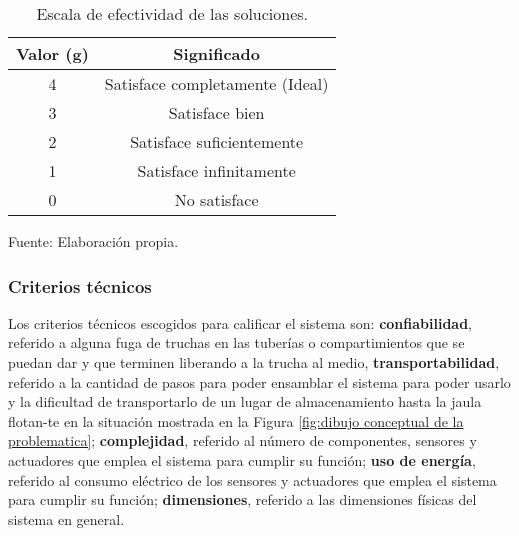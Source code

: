 \begin{table}[H]
	\centering
	\caption{Escala de efectividad de las soluciones.}
	\label{tab:escala de efectividad de las soluciones}
	\begin{tabular}{|c|c|}
		\hline
		\rowcolor[HTML]{D9D9D9} 
		\textbf{Valor (g)} & \textbf{Significado} 					\\ \hline
		4                  & Satisface completamente (Ideal)        \\ \hline
		3                  & Satisface bien           				\\ \hline
		2                  & Satisface suficientemente        		\\ \hline
		1                  & Satisface infinitamente     			\\ \hline
		0                  & No satisface				     		\\ \hline
	\end{tabular}
	\begin{myflushleftportland}
		Fuente: Elaboración propia.
	\end{myflushleftportland}
\end{table}


\subsubsection{Criterios técnicos}

Los criterios técnicos escogidos para calificar el sistema son: \textbf{confiabilidad}, referido a alguna fuga de truchas en las tuberías o compartimientos que se puedan dar y que terminen liberando a la trucha al medio, \textbf{transportabilidad}, referido a la cantidad de pasos para poder ensamblar el sistema para poder usarlo y la dificultad de transportarlo de un lugar de almacenamiento hasta la jaula flotan-te en la situación mostrada en la Figura \ref{fig:dibujo conceptual de la problematica}; \textbf{complejidad}, referido al número de componentes, sensores y actuadores que emplea el sistema para cumplir su función; \textbf{uso de energía}, referido al consumo eléctrico de los sensores y actuadores que emplea el sistema para cumplir su función; \textbf{dimensiones}, referido a las dimensiones físicas del sistema en general.


